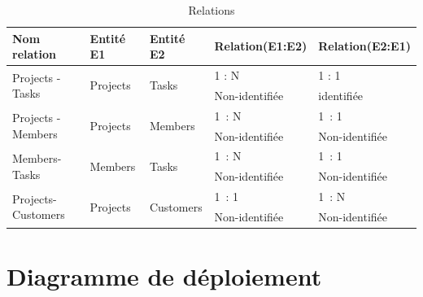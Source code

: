 \FloatBarrier
\begin{table}
\begin{tabular}{|l|l|l|l|l|}
\hline
Nom relation                        & Entité E1                 & Entité E2                  & Relation(E1:E2) & Relation(E2:E1)  \\
\hline
\multirow{2}{*}{Projects -Tasks}    & \multirow{2}{*}{Projects} & \multirow{2}{*}{Tasks}     & 1 : N           & 1 : 1            \\
\cline{4-5}
                                    &                           &                            & Non-identifiée  & identifiée       \\
\hline
\multirow{2}{*}{Projects -Members}  & \multirow{2}{*}{Projects} & \multirow{2}{*}{Members}   & 1~: N           & 1~: 1            \\
\cline{4-5}
                                    &                           &                            & Non-identifiée  & Non-identifiée   \\
\hline
\multirow{2}{*}{Members-Tasks}      & \multirow{2}{*}{Members}  & \multirow{2}{*}{Tasks}     & 1~: N           & 1~: 1            \\
\cline{4-5}
                                    &                           &                            & Non-identifiée  & Non-identifiée   \\
\hline
\multirow{2}{*}{Projects-Customers} & \multirow{2}{*}{Projects} & \multirow{2}{*}{Customers} & 1~: 1           & 1~: N            \\
\cline{4-5}
                                    &                           &                            & Non-identifiée  & Non-identifiée   \\
\hline
\end{tabular}
\centering
\caption {Relations}
\end{table}

\FloatBarrier
\newpage



\section{Diagramme de d\'{e}ploiement }


\newpage

